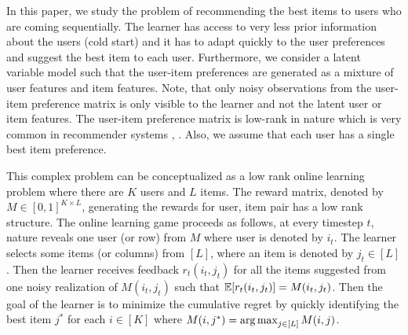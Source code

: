In this paper, we study the problem of recommending the best items to users who are coming sequentially. The learner has access to very less prior information about the users (cold start) and it has to adapt quickly to the user preferences and suggest the best item to each user. Furthermore, we consider a latent variable model such that the user-item preferences are generated as a mixture of user features and item features. Note, that only noisy observations from the user-item preference matrix is only visible to the learner and not the latent user or item features. The user-item preference matrix is low-rank in nature which is very common in recommender systems \citep{koren2009matrix}, \citep{ricci2011liorrokach}. Also, we assume that each user has a single best item preference.

	This complex problem can be conceptualized as a low rank online learning  problem where there are $K$ users and $L$ items. The reward matrix, denoted by $M\in [0,1]^{K\times L}$,  generating the rewards for user, item pair has a low rank structure. The online learning game proceeds as follows, at every timestep $t$,  nature reveals one user (or row) from $M$ where user is denoted by $i_t$. The learner selects some items (or columns) from $[L]$, where an item is denoted by $j_t\in [L]$. Then the learner receives feedback $r_{t}(i_t,j_t)$ for all the items suggested from one noisy realization of $M(i_t,j_t)$ such that $\mathbb{E}[r_{t}(i_t,j_t)] = M(i_t,j_t)$. Then the goal of the learner is to minimize the cumulative regret by quickly identifying the best item $j^*$ for each $i\in [K]$ where $M(i,j^*) = \mathop{\rm arg\,max} _{j\in[L]} M(i,j)$. 
	
